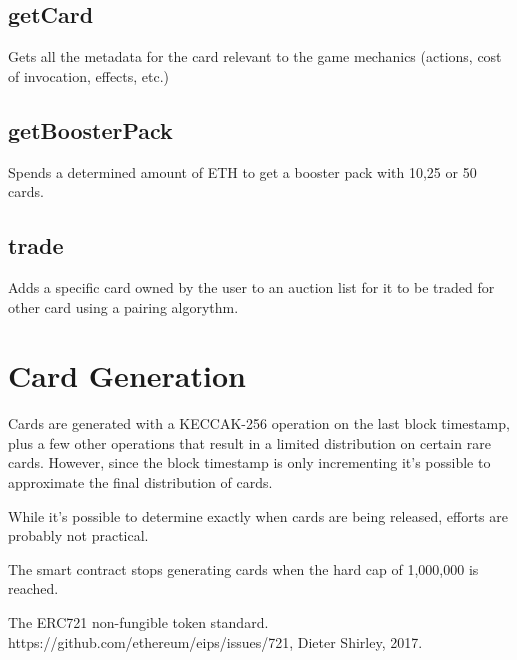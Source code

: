 \documentclass[11pt,twocolumn]{article}
\begin{document}
\subsection{getCard}
Gets all the metadata for the card relevant to the game mechanics (actions, cost of invocation, effects, etc.)
\subsection{getBoosterPack}
Spends a determined amount of ETH to get a booster pack with 10,25 or 50 cards.
\subsection{trade}
Adds a specific card owned by the user to an auction list for it to be traded for other card using a pairing algorythm.

\section{Card Generation}
Cards are generated with a KECCAK-256 operation on the last block timestamp, plus a few other operations that result in a limited distribution on certain rare cards. However, since the block timestamp is only incrementing it's possible to approximate the final distribution of cards.

While it's possible to determine exactly when cards are being released, efforts are probably not practical. 

The smart contract stops generating cards when the hard cap of 1,000,000 is reached.

\onecolumn
\begin{figure}[!htb]
    \centering 

\label{figa2} 
\end{figure}



\begin{thebibliography}{1}

         The ERC721 non-fungible token standard. https://github.com/ethereum/eips/issues/721, Dieter Shirley, 2017.
      
        \end{thebibliography}
\end{document}
